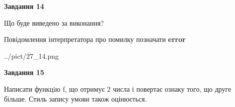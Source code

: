 \documentclass[11pt, ukrainian]{article}
\begin{document}
{\begin {large}
{\begin {center}\textbf{Завдання 14}\end {center}}\par
Що буде виведено за виконання? \par
Повідомлення інтерпретатора про помилку позначати \textbf{error}

\begin{center}
	{../pict/27_14.png}
\end{center}
\newpage

{\begin {center}\textbf{Завдання 15}\end {center}}\par

Написати функцiю f, що отримує 2 числа і повертає ознаку того, що друге більше. Стиль запису умови також оцінюється.\par
\newpage

\end {large}}
\end{document}
